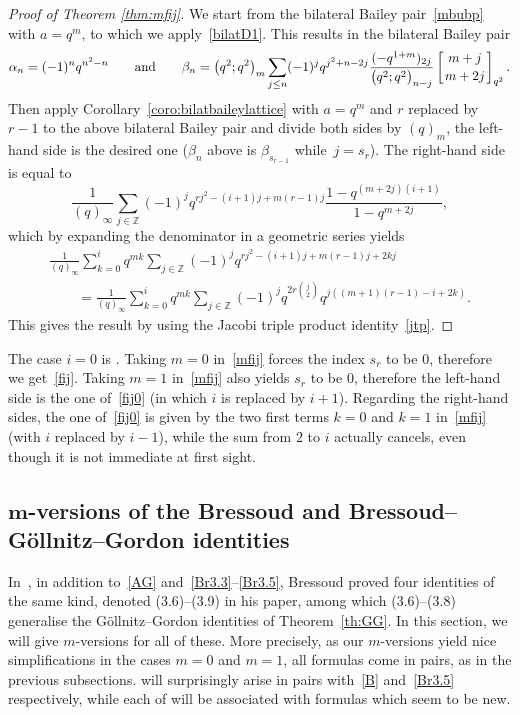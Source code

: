 \documentclass[pdftex]{sigma}
\numberwithin{equation}{section}
\begin{document}
\begin{proof}[Proof of Theorem \ref{thm:mfij}]
We start from the bilateral Bailey pair~\eqref{mbubp} with $a=q^m$, to which we apply~\eqref{bilatD1}. This results in the bilateral Bailey pair
\begin{equation*}
\alpha_n=(-1)^nq^{n^2-n}\qquad \mbox{and}\qquad\beta_n=\bigl(q^2;q^2\bigr)_m\sum_{j\leq n}(-1)^jq^{j^2+n-2j}\frac{(-q^{1+m})_{2j}}{\bigl(q^2;q^2\bigr)_{n-j}}\left[{m+j\atop m+2j}\right]_{q^2}.
\end{equation*}
Then apply Corollary~\ref{coro:bilatbaileylattice} with $a=q^m$ and $r$ replaced by $r-1$ to the above bilateral Bailey pair and divide both sides by $(q)_m$, the left-hand side is the desired one ($\beta_n$ above is $\beta_{s_{r-1}}$ while~${j=s_r}$). The right-hand side is equal to
\begin{equation*}
\frac{1}{(q)_\infty}\sum_{j\in\mathbb{Z}}(-1)^jq^{rj^2-(i+1)j+m(r-1)j}\frac{1-q^{(m+2j)(i+1)}}{1-q^{m+2j}},
\end{equation*}
which by expanding the denominator in a geometric series yields
\begin{gather*}
\frac{1}{(q)_\infty}\sum_{k=0}^iq^{mk}\sum_{j\in\mathbb{Z}}(-1)^{j}q^{rj^2-(i+1)j+m(r-1)j+2kj}\\
\qquad=\frac{1}{(q)_\infty}\sum_{k=0}^iq^{mk}\sum_{j\in\mathbb{Z}}(-1)^{j}q^{2r\binom{j}{2}}q^{j((m+1)(r-1)-i+2k)}.
\end{gather*}
This gives the result by using the Jacobi triple product identity~\eqref{jtp}.
\end{proof}

The case $i=0$ is \cite[Theorem~3.2]{J}. Taking $m=0$ in~\eqref{mfij} forces the index $s_r$ to be $0$, therefore we get~\eqref{fij}. Taking $m=1$ in~\eqref{mfij} also yields $s_r$ to be $0$, therefore the left-hand side is the one of~\eqref{fij0} (in which $i$ is replaced by $i+1$). Regarding the right-hand sides, the one of~\eqref{fij0} is given by the two first terms $k=0$ and $k=1$ in~\eqref{mfij} (with $i$ replaced by $i-1$), while the sum from $2$ to $i$ actually cancels, even though it is not immediate at first sight.

\subsection[m-versions of the Bressoud and Bressoud--Gollnitz--Gordon identities]{$\boldsymbol{m}$-versions of the Bressoud and Bressoud--G\"ollnitz--Gordon identities}

In~\cite{Br80}, in addition to~\eqref{AG} and~\eqref{Br3.3}--\eqref{Br3.5}, Bressoud proved four identities of the same kind, denoted (3.6)--(3.9) in his paper, among which (3.6)--(3.8) generalise the G\"ollnitz--Gordon identities of Theorem~\ref{th:GG}. In this section, we will give $m$-versions for all of these. More precisely, as our $m$-versions yield nice simplifications in the cases $m=0$ and $m=1$, all formulas come in pairs, as in the previous subsections. \cite[formulas~(3.6) and (3.7)]{Br80} will surprisingly arise in pairs with~\eqref{B} and~\eqref{Br3.5} respectively, while each of \cite[formulas~(3.8) and~(3.9)]{Br80} will be associated with formulas which seem to be new.
\end{document}
